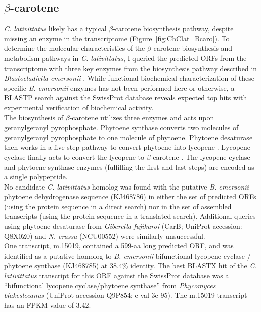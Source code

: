 \subsection*{$\beta$-carotene}
\textit{C. lativittatus} likely has a typical $\beta$-carotene biosynthesis pathway, despite missing an enzyme in the transcriptome (Figure~\ref{fig:ChClat_Bcaro}). To determine the molecular characteristics of the $\beta$-carotene biosynthesis and metabolism pathways in \textit{C. lativittatus}, I queried the predicted ORFs from the transcriptome with three key enzymes from the biosynthesis pathway described in \textit{Blastocladiella emersonii} \cite{Avelar2014}. While functional biochemical characterization of these specific \textit{B. emersonii} enzymes has not been performed here or otherwise, a BLASTP search against the SwissProt database reveals expected top hits with experimental verification of biochemical activity. \\
\indent The biosynthesis of $\beta$-carotene utilizes three enzymes and acts upon geranylgeranyl pyrophosphate. Phytoene synthase converts two molecules of geranylgeranyl pyrophosphate to one molecule of phytoene. Phytoene desaturase then works in a five-step pathway to convert phytoene into lycopene \cite{Hausmann2000}. Lycopene cyclase finally acts to convert the lycopene to $\beta$-carotene \cite{Cunningham1994}. The lycopene cyclase and phytoene synthase enzymes (fulfilling the first and last steps) are encoded as a single polypeptide.\\
\indent No candidate \textit{C. lativittatus} homolog was found with the putative \textit{B. emersonii} phytoene dehydrogenase sequence (KJ468786) in either the set of predicted ORFs (using the protein sequence in a direct search) nor in the set of assembled transcripts (using the protein sequence in a translated search). Additional queries using phytoene desaturase from \textit{Giberella fujikuroi} (CarB; UniProt accession: Q8X0Z0) and \textit{N. crassa} (NCU00552) were similarly unsuccessful. \\
\indent One transcript, m.15019, contained a 599-aa long predicted ORF, and was identified as a putative homolog to \textit{B. emersonii} bifunctional lycopene cyclase / phytoene synthase (KJ468785) at 38.4\% identity. The best BLASTX hit of the \textit{C. lativittatus} transcript for this ORF against the SwissProt database was a \enquote{bifunctional lycopene cyclase/phytoene synthase} from\textit{ Phycomyces blakesleeanus} (UniProt accession Q9P854; e-val 3e-95). The m.15019 transcript has an FPKM value of 3.42. \\
